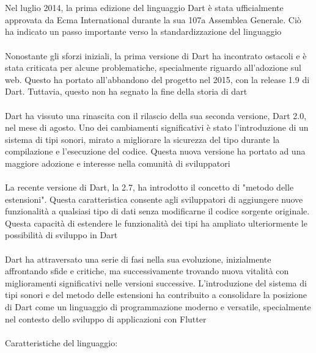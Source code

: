 \documentclass{report}
\begin{document}
\\
\\
Nel luglio 2014, la prima edizione del linguaggio Dart è stata ufficialmente approvata da Ecma International durante la sua 107a Assemblea Generale. Ciò ha indicato un passo importante verso la standardizzazione del linguaggio
\\
\\
Nonostante gli sforzi iniziali, la prima versione di Dart ha incontrato ostacoli e è stata criticata per alcune problematiche, specialmente riguardo all'adozione sul web. Questo ha portato all'abbandono del progetto nel 2015, con la release 1.9 di Dart. Tuttavia, questo non ha segnato la fine della storia di dart
\\
\\
Dart ha vissuto una rinascita con il rilascio della sua seconda versione, Dart 2.0, nel mese di agosto. Uno dei cambiamenti significativi è stato l'introduzione di un sistema di tipi sonori, mirato a migliorare la sicurezza del tipo durante la compilazione e l'esecuzione del codice. Questa nuova versione ha portato ad una maggiore adozione e interesse nella comunità di sviluppatori
\\
\\
La recente versione di Dart, la 2.7, ha introdotto il concetto di "metodo delle estensioni". Questa caratteristica consente agli sviluppatori di aggiungere nuove funzionalità a qualsiasi tipo di dati senza modificarne il codice sorgente originale. Questa capacità di estendere le funzionalità dei tipi ha ampliato ulteriormente le possibilità di sviluppo in Dart
\\
\\
Dart ha attraversato una serie di fasi nella sua evoluzione, inizialmente affrontando sfide e critiche, ma successivamente trovando nuova vitalità con miglioramenti significativi nelle versioni successive. L'introduzione del sistema di tipi sonori e del metodo delle estensioni ha contribuito a consolidare la posizione di Dart come un linguaggio di programmazione moderno e versatile, specialmente nel contesto dello sviluppo di applicazioni con Flutter
\\
\\
Caratteristiche del linguaggio:
\\
\end{document}

